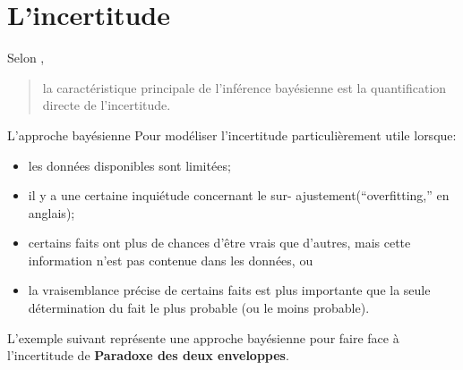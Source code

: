 \section{L'incertitude}
Selon \cite{BDA_GCSDVR}, \begin{quote}la caract\'eristique principale de l'inf\'erence bay\'esienne est la quantification directe de l'incertitude.\end{quote}
L'approche bay\'esienne Pour mod\'eliser l'incertitude particuli\`erement utile lorsque:
\begin{itemize}[noitemsep]
	\item les donn\'ees disponibles sont limit\'ees;
	\item il y a une certaine inqui\'etude concernant le sur- ajustement(``overfitting,'' en anglais);
	\item certains faits ont plus de chances d'être vrais que d'autres, mais cette information n'est pas contenue dans les donn\'ees, ou
	\item la vraisemblance pr\'ecise de certains faits est plus importante que la seule d\'etermination du fait le plus probable (ou le moins probable).
\end{itemize}
L'exemple suivant repr\'esente une approche bay\'esienne pour faire face \`a l'incertitude de \textbf{Paradoxe des deux enveloppes}.
